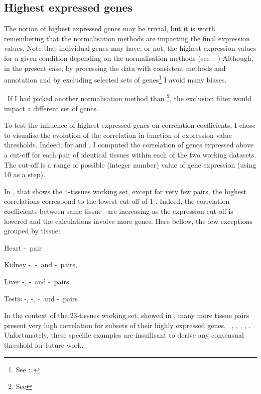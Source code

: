 \subsection{Highest expressed genes}

The notion of highest expressed genes may be trivial,
but it is worth remembering that the normalisation methods are impacting
the final expression values.
Note that individual genes may have, or not,
the highest expression values for a given condition
depending on the normalisation methods
(see :~)
Although, in the present case,
by processing the data with consistent methods and annotation
and by excluding selected sets of
genes\footnote{See :~}
I avoid many biases.

\NB\ If I had picked another normalisation method than \FPKM\footnote{See
},
the exclusion filter would impact a different set of genes.

To test the influence of highest expressed genes on correlation coefficients,
I chose to visualise the evolution of the correlation
in function of expression value thresholds.
Indeed, for  and ,
I computed the correlation of genes expressed above a cut-off
for each pair of identical tissues within each of the two working datasets.
The cut-off is a range of possible (integer number) value of gene expression
(using 10 as a step).

In , that shows the 4-tissues working set,
except for very few pairs, the highest correlations correspond to
the lowest cut-off of 1 \FPKM\@.
Indeed, the correlation coefficients between same tissue \treps\
are increasing as the expression cut-off is lowered
and the calculations involve more genes.
Here bellow, the few exceptions grouped by tissue:
\begin{eqlist}[\eqliststarinit\def\makelabel#1{\bfseries#1}\labelsep1em]
\item[Heart] \uhlen{}-\gtex\ pair
\item[Kidney] \uhlen{}-\gtex, \castle{}-\uhlen\ and \castle{}-\gtex\ pairs,
\item[Liver]  \vt{}-\ibm, \ibm{}-\uhlen\ and \ibm{}-\uhlen\ pairs;
\item[Testis] \ibm{}-\uhlen, \vt{}-\gtex, \vt{}-\uhlen\ and \uhlen{}-\gtex\ pairs
\end{eqlist}

In the context of the 23-tissues working set,
showed in ,
many more tissue pairs present very high correlation for subsets of their highly
expressed genes, \ie\ \skeletal, \Thyroid, \Cortex, \Uterus, \Kidney.
Unfortunately, these specific examples are insuffisant
to derive any consensual threshold for future work.


